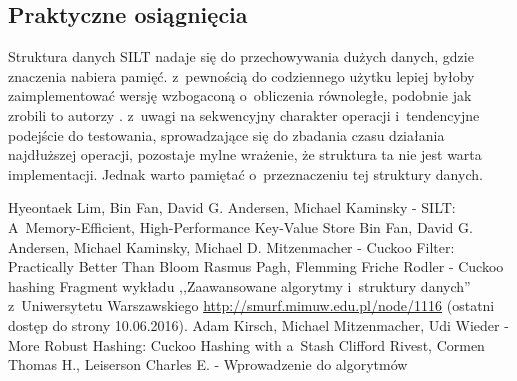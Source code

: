 \documentclass[declaration,shortabstract,masc]{iithesis}
\begin{document}
			\subsection{Praktyczne osiągnięcia}
				Struktura danych SILT nadaje się do przechowywania dużych danych, gdzie znaczenia nabiera pamięć. z~pewnością do codziennego użytku lepiej byłoby zaimplementować wersję wzbogaconą o~obliczenia równoległe, podobnie jak zrobili to autorzy \cite{SILT}. z~uwagi na sekwencyjny charakter operacji i~tendencyjne podejście do testowania, sprowadzające się do zbadania czasu działania najdłuższej operacji, pozostaje mylne wrażenie, że struktura ta nie jest warta implementacji. Jednak warto pamiętać o~przeznaczeniu tej struktury danych.
	\begin{thebibliography}{3}
		 Hyeontaek Lim, Bin Fan, David G. Andersen, Michael Kaminsky - SILT: A~Memory-Efficient, High-Performance Key-Value Store
		 Bin Fan, David G. Andersen, Michael Kaminsky, Michael D. Mitzenmacher - Cuckoo Filter: Practically Better Than Bloom
		 Rasmus Pagh, Flemming Friche Rodler - Cuckoo hashing
		 Fragment wykładu ,,Zaawansowane algorytmy i~struktury danych'' z~Uniwersytetu Warszawskiego \url{http://smurf.mimuw.edu.pl/node/1116} (ostatni dostęp do strony 10.06.2016).
		 Adam Kirsch, Michael Mitzenmacher, Udi Wieder - More Robust Hashing: Cuckoo Hashing with a~Stash
		 Clifford Rivest, Cormen Thomas H., Leiserson Charles E. - Wprowadzenie do algorytmów
	\end{thebibliography}
\end{document}
